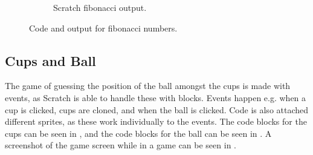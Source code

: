 \begin{figure}[h]
\begin{subfigure}[b]{0.45\textwidth}
\begin{center}
      \caption{Scratch fibonacci output.}
      \label{fig:scratch_fibo_out}
    \end{center}
    \end{subfigure}
    \caption{Code and output for fibonacci numbers.}
    \label{fig:scratch_fibo}
\end{figure}

\subsection{Cups and Ball}
The game of guessing the position of the ball amongst the cups is made with events, as Scratch is able to handle these with blocks. Events happen e.g. when a cup is clicked, cups are cloned, and when the ball is clicked. Code is also attached different sprites, as these work individually to the events. The code blocks for the cups can be seen in , and the code blocks for the ball can be seen in . A screenshot of the game screen while in a game can be seen in .

